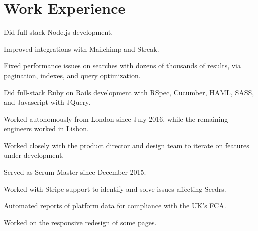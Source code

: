 \documentclass[letterpaper]{deedy-resume} %
\begin{document}
\begin{minipage}[t]{0.66\textwidth} %


\section{Work Experience}


\vspace{\topsep} %
\begin{tightitemize}
\item Did full stack Node.js development.
\item Improved integrations with Mailchimp and Streak.
\item Fixed performance issues on searches with dozens of thousands of results, via pagination, indexes, and query optimization.
\end{tightitemize}

\sectionspace %


\vspace{\topsep} %
\begin{tightitemize}
\item Did full-stack Ruby on Rails development with RSpec, Cucumber, HAML, SASS, and Javascript with JQuery.
\item Worked autonomously from London since July 2016, while the remaining engineers worked in Lisbon.
\item Worked closely with the product director and design team to iterate on features under development.
\item Served as Scrum Master since December 2015.
\item Worked with Stripe support to identify and solve issues affecting Seedrs.
\item Automated reports of platform data for compliance with the UK's FCA.
\item Worked on the responsive redesign of some pages.
\end{tightitemize}


\end{minipage}
\end{document}
